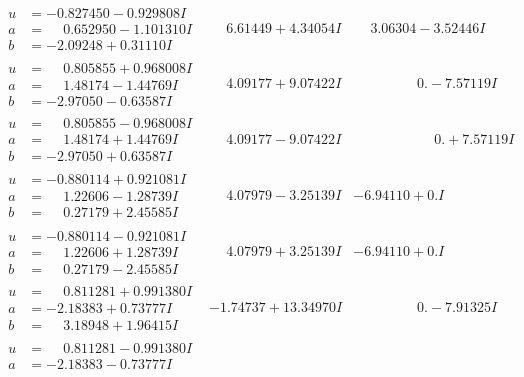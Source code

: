 \documentclass[1p]{elsarticle_modified}
\theoremstyle{definition}
\begin{document}
$$\begin{array}{c|c|c}
\begin{aligned}
u &= -0.827450 - 0.929808 I \\
a &= \phantom{-}0.652950 - 1.101310 I \\
b &= -2.09248 + 0.31110 I\end{aligned}
 & \phantom{-}6.61449 + 4.34054 I & \phantom{-}3.06304 - 3.52446 I \\ \hline\begin{aligned}
u &= \phantom{-}0.805855 + 0.968008 I \\
a &= \phantom{-}1.48174 - 1.44769 I \\
b &= -2.97050 - 0.63587 I\end{aligned}
 & \phantom{-}4.09177 + 9.07422 I & \phantom{-0.000000 } 0. - 7.57119 I \\ \hline\begin{aligned}
u &= \phantom{-}0.805855 - 0.968008 I \\
a &= \phantom{-}1.48174 + 1.44769 I \\
b &= -2.97050 + 0.63587 I\end{aligned}
 & \phantom{-}4.09177 - 9.07422 I & \phantom{-0.000000 -}0. + 7.57119 I \\ \hline\begin{aligned}
u &= -0.880114 + 0.921081 I \\
a &= \phantom{-}1.22606 - 1.28739 I \\
b &= \phantom{-}0.27179 + 2.45585 I\end{aligned}
 & \phantom{-}4.07979 - 3.25139 I & -6.94110 + 0. I\phantom{ +0.000000I} \\ \hline\begin{aligned}
u &= -0.880114 - 0.921081 I \\
a &= \phantom{-}1.22606 + 1.28739 I \\
b &= \phantom{-}0.27179 - 2.45585 I\end{aligned}
 & \phantom{-}4.07979 + 3.25139 I & -6.94110 + 0. I\phantom{ +0.000000I} \\ \hline\begin{aligned}
u &= \phantom{-}0.811281 + 0.991380 I \\
a &= -2.18383 + 0.73777 I \\
b &= \phantom{-}3.18948 + 1.96415 I\end{aligned}
 & -1.74737 + 13.34970 I & \phantom{-0.000000 } 0. - 7.91325 I \\ \hline\begin{aligned}
u &= \phantom{-}0.811281 - 0.991380 I \\
a &= -2.18383 - 0.73777 I \\

\end{aligned}
\end{array}$$
\end{document}
